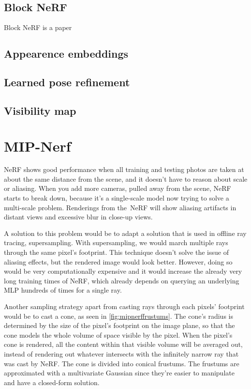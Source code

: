 \subsection{Block NeRF}
Block NeRF is a paper 

\subsection{Appearence embeddings}

\subsection{Learned pose refinement}

\subsection{Visibility map}





\section{MIP-Nerf}\label{sec:mipnerf}
NeRF shows good performance when all training and testing photos are taken at about the same distance from the scene, and it doesn't have to reason about scale or aliasing. When you add more cameras, pulled away from the scene, NeRF starts to break down, because it's a single-scale model now trying to solve a multi-scale problem. Renderings from the NeRF will show aliasing artifacts in distant views and excessive blur in close-up views.

A solution to this problem would be to adapt a solution that is used in offline ray tracing, supersampling. With supersampling, we would march multiple rays through the same pixel's footprint. This technique doesn't solve the issue of aliasing effects, but the rendered image would look better. However, doing so would be very computationally expensive and it would increase the already very long training times of NeRF, which already depends on querying an underlying MLP hundreds of times for a single ray.

Another sampling strategy apart from casting rays through each pixels' footprint would be to cast a cone, as seen in \autoref{fig:mipnerffrustums}. The cone's radius is determined by the size of the pixel's footprint on the image plane, so that the cone models the whole volume of space visible by the pixel. When the pixel's cone is rendered, all the content within that visible volume will be averaged out, instead of rendering out whatever intersects with the infinitely narrow ray that was cast by NeRF. The cone is divided into conical frustums. The frustums are approximated with a multivariate Gaussian since they're easier to manipulate and have a closed-form solution.

